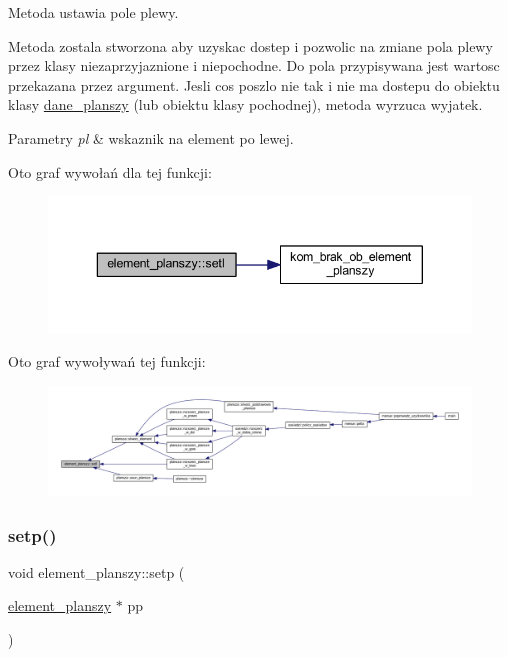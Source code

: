 Metoda ustawia pole plewy.

Metoda zostala stworzona aby uzyskac dostep i pozwolic na zmiane pola plewy przez klasy niezaprzyjaznione i niepochodne. Do pola przypisywana jest wartosc przekazana przez argument. Jesli cos poszlo nie tak i nie ma dostepu do obiektu klasy \mbox{\hyperlink{classdane__planszy}{dane\+\_\+planszy}} (lub obiektu klasy pochodnej), metoda wyrzuca wyjatek. 
\begin{DoxyParams}{Parametry}
{\em pl} & wskaznik na element po lewej. \\
\hline
\end{DoxyParams}
Oto graf wywołań dla tej funkcji\+:
\nopagebreak
\begin{figure}[H]
\begin{center}
\leavevmode
\includegraphics[width=343pt]{classelement__planszy_a9e89f466ff2fe27b7796d84e3967599c_cgraph}
\end{center}
\end{figure}
Oto graf wywoływań tej funkcji\+:
\nopagebreak
\begin{figure}[H]
\begin{center}
\leavevmode
\includegraphics[width=350pt]{classelement__planszy_a9e89f466ff2fe27b7796d84e3967599c_icgraph}
\end{center}
\end{figure}
\mbox{\label{classelement__planszy_a38094d3cf8ce3543fa3e0720f30583e9}} 
\subsubsection{\texorpdfstring{setp()}{setp()}}
{\footnotesize\ttfamily void element\+\_\+planszy\+::setp (\begin{DoxyParamCaption}\item[{\mbox{\hyperlink{classelement__planszy}{element\+\_\+planszy}} $\ast$}]{pp }\end{DoxyParamCaption})}

